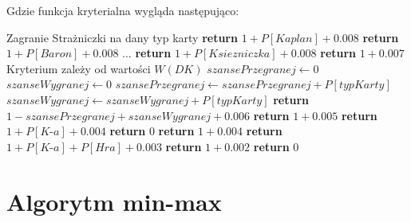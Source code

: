 Gdzie funkcja kryterialna wygląda następująco:
\begin{algorithmic}[1]
			 \Comment Zagranie Strażniczki na dany typ karty
				\State \textbf{return} $ 1 + P[Kaplan] + 0.008 $
			\EndCase
				\State \textbf{return} $ 1 + P[Baron]  + 0.008 $
			\EndCase
			\State ...
				\State \textbf{return} $ 1 + P[Ksiezniczka]  + 0.008 $
			\EndCase
				\State \textbf{return} $ 1 + 0.007 $
			\EndCase
				\Comment Kryterium zależy od wartości $W(DK)$
				\State $ szansePrzegranej \gets 0$ 
				\State $ szanseWygranej \gets 0$ 
						\State $szansePrzegranej \gets szansePrzegranej + P[typKarty]$ 
						\State $szanseWygranej \gets szanseWygranej + P[typKarty]$ 
					\EndIf
				\EndFor
				\State \textbf{return} $ 1 - szansePrzegranej + szanseWygranej + 0.006 $
			\EndCase
				\State \textbf{return} $ 1 + 0.005 $
			\EndCase
				\State \textbf{return} $ 1 + P[\textit{K-a}] + 0.004 $
			\EndCase
					\State \textbf{return} $ 0 $
				\Else
					\State \textbf{return} $ 1 + 0.004 $
				\EndIf
			\EndCase
				\State \textbf{return} $ 1 + P[\textit{K-a}] + P[Hra] + 0.003 $
			\EndCase
				\State \textbf{return} $ 1 + 0.002 $
			\EndCase
				\State \textbf{return} $ 0 $
			\EndCase
		\EndSwitch
	\EndFunction
\end{algorithmic}


\section{Algorytm min-max}
\label{sec:minmax}
